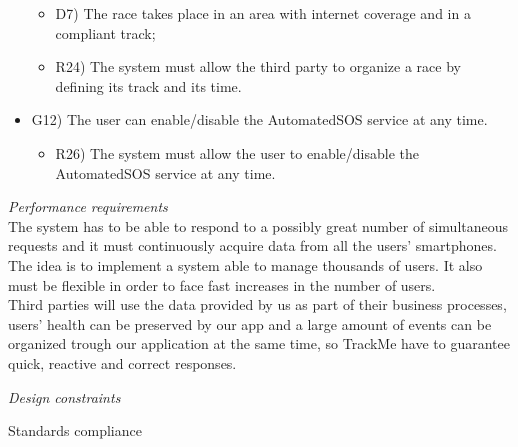 \documentclass{article}
\begin{document}
\begin{legal}
\begin{legal}
\begin{legal}
\begin{itemize}
{\begin{itemize}
					\item D7) The race takes place in an area with internet coverage and in a compliant track;\\
					\item R24) The system must allow the third party to organize a race by defining its track and its time.\\
					\end{itemize}
				}
				\item G12) The user can enable/disable the AutomatedSOS service at any time.\\
				{\normalfont
					\begin{itemize}
					\item R26) The system must allow the user to enable/disable the AutomatedSOS service at any time.\\
					\end{itemize}
				}
				\end{itemize}
			\end{legal}
    		
		\item \textit{Performance requirements}\\
			{\normalfont
The system has to be able to respond to a possibly great number of simultaneous requests and it must continuously acquire data from all the users' smartphones. The idea is to implement a system able to manage thousands of users. It also must be flexible in order to face fast increases in the number of users.\\
Third parties will use the data provided by us as part of their business processes, users' health can be preserved by our app and a large amount of events can be organized trough our application at the same time, so TrackMe have to guarantee quick, reactive and correct responses.
			}
		\item \textit{Design constraints}\\
			\begin{legal}
			\item Standards compliance\\
			\begin{itemize}
			\end{itemize}
	

\end{legal}
\end{legal}
\end{legal}
\end{document}
